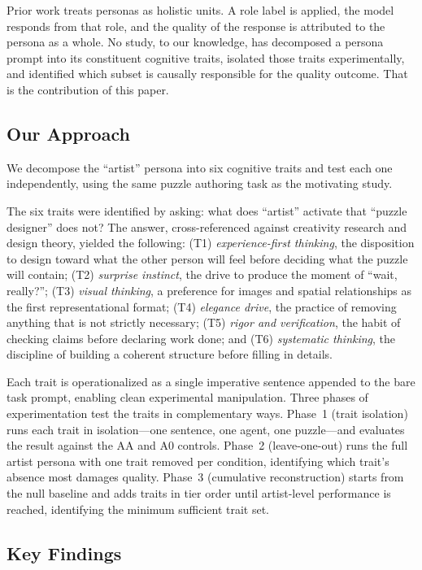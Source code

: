 Prior work treats personas as holistic units. A role label is applied, the model responds from that role, and the quality of the response is attributed to the persona as a whole. No study, to our knowledge, has decomposed a persona prompt into its constituent cognitive traits, isolated those traits experimentally, and identified which subset is causally responsible for the quality outcome. That is the contribution of this paper.

\subsection{Our Approach}

We decompose the ``artist'' persona into six cognitive traits and test each one independently, using the same puzzle authoring task as the motivating study.

The six traits were identified by asking: what does ``artist'' activate that ``puzzle designer'' does not? The answer, cross-referenced against creativity research and design theory, yielded the following: (T1) \emph{experience-first thinking}, the disposition to design toward what the other person will feel before deciding what the puzzle will contain; (T2) \emph{surprise instinct}, the drive to produce the moment of ``wait, really?''; (T3) \emph{visual thinking}, a preference for images and spatial relationships as the first representational format; (T4) \emph{elegance drive}, the practice of removing anything that is not strictly necessary; (T5) \emph{rigor and verification}, the habit of checking claims before declaring work done; and (T6) \emph{systematic thinking}, the discipline of building a coherent structure before filling in details.

Each trait is operationalized as a single imperative sentence appended to the bare task prompt, enabling clean experimental manipulation. Three phases of experimentation test the traits in complementary ways. Phase~1 (trait isolation) runs each trait in isolation---one sentence, one agent, one puzzle---and evaluates the result against the AA and A0 controls. Phase~2 (leave-one-out) runs the full artist persona with one trait removed per condition, identifying which trait's absence most damages quality. Phase~3 (cumulative reconstruction) starts from the null baseline and adds traits in tier order until artist-level performance is reached, identifying the minimum sufficient trait set.

\subsection{Key Findings}

